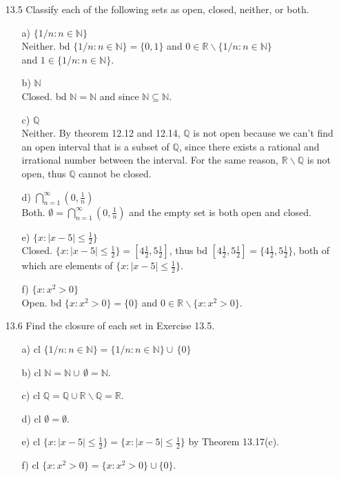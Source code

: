 \documentclass[12pt]{article}
\begin{document}
\begin{enumerate}
\item[13.5] Classify each of the following sets as open, closed, neither, or both. 
\begin{enumerate}
\item[a)] $\{ 1/n: n \in \mathbb{N} \}$ \\
Neither. bd $\{ 1/n: n \in \mathbb{N} \} = \{ 0, 1 \}$ and $0 \in \mathbb{R}\backslash 
\{ 1/n: n \in \mathbb{N} \}$ \\
and $1 \in \{ 1/n: n \in \mathbb{N} \}$.
\item[b)] $\mathbb{N}$ \\
Closed. bd $\mathbb{N} = \mathbb{N}$ and since $\mathbb{N} \subseteq \mathbb{N}$.
\item[c)] $\mathbb{Q}$ \\
Neither. By theorem 12.12 and 12.14, $\mathbb{Q}$ is not open because we can't find an open
interval that is a subset of $\mathbb{Q}$, since there exists a rational and irrational number between
the interval. For the same reason, $\mathbb{R}\backslash \mathbb{Q}$ is not open, thus $\mathbb{Q}$
cannot be closed.
\item[d)] $\bigcap_{n = 1}^{\infty} \left(0, \frac{1}{n}\right)$ \\
Both. $\emptyset = \bigcap_{n = 1}^{\infty} \left(0, \frac{1}{n}\right)$ and the empty set is
both open and closed.
\item[e)] $\{ x : |x - 5| \leq \frac{1}{2} \}$ \\
Closed. $\{ x : |x - 5| \leq \frac{1}{2} \} = [4\frac{1}{2}, 5\frac{1}{2}]$, thus bd 
$[4\frac{1}{2}, 5\frac{1}{2}] = \{4\frac{1}{2}, 5\frac{1}{2}\}$, both of which are elements of 
$\{ x : |x - 5| \leq \frac{1}{2} \}$.
\item[f)] $\{x: x^2 > 0\}$ \\
Open. bd $\{x: x^2 > 0\} = \{0\}$ and $0 \in \mathbb{R}\backslash \{x: x^2 > 0\}$.
\end{enumerate}

\item[13.6] Find the closure of each set in Exercise 13.5.
\begin{enumerate}
\item[a)] cl $\{ 1/n: n \in \mathbb{N} \} = \{ 1/n: n \in \mathbb{N} \} \cup \,\{0\}$
\item[b)] cl $\mathbb{N} = \mathbb{N} \cup \,\emptyset = \mathbb{N}$.
\item[c)] cl $\mathbb{Q} = \mathbb{Q} \cup \mathbb{R}\backslash \mathbb{Q} = \mathbb{R}$.
\item[d)] cl $\emptyset = \emptyset$.
\item[e)] cl $\{ x : |x - 5| \leq \frac{1}{2} \} = \{ x : |x - 5| \leq \frac{1}{2} \}$ by Theorem 13.17(c).
\item[f)] cl $\{x: x^2 > 0\} = \{x: x^2 > 0\} \cup \{0\}$.
\end{enumerate}


\end{enumerate}
\end{document}
